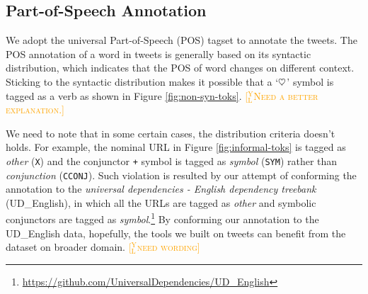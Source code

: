 \documentclass[11pt,letterpaper]{article}
\newcommand{\heart}{\ensuremath\heartsuit}
\newcommand{\yjcomment}[1]{\textcolor{orange}{[$_\mathrm{L}^\mathrm{Y}$\textsc{#1}]}}
\begin{document}
%


\subsection{Part-of-Speech Annotation}
We adopt the universal Part-of-Speech (POS) tagset \cite{PETROV12.274} to annotate the tweets.
The POS annotation of a word in tweets is generally based on its syntactic distribution, which indicates that the POS of word changes on different context.
Sticking to the syntactic distribution makes it possible that a `$\heart$' symbol is tagged as a verb as shown in Figure \ref{fig:non-syn-toks}. \yjcomment{Need a better explanation.}

We need to note that in some certain cases, the distribution criteria doesn't holds.
For example, the nominal URL in Figure \ref{fig:informal-toks} is tagged as {\it other} ({\tt X}) and the conjunctor {\tt +} symbol is tagged as {\it symbol} ({\tt SYM}) rather than {\it conjunction} ({\tt CCONJ}).
Such violation is resulted by our attempt of conforming the annotation to the {\it universal dependencies - English dependency treebank} (UD\_English), in which all the URLs are tagged as {\it other} and symbolic conjunctors are tagged as {\it symbol}.\footnote{\url{https://github.com/UniversalDependencies/UD\_English}}
By conforming our annotation to the UD\_English data, hopefully, the tools we built on tweets can benefit from the dataset on broader domain. \yjcomment{need wording}
\end{document}
